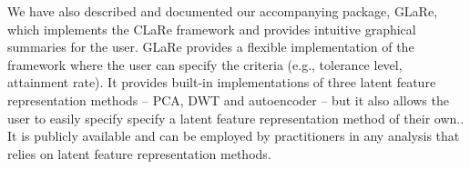 We have also described and documented our accompanying  package, GLaRe, which implements the CLaRe framework and provides intuitive graphical summaries for the user.
GLaRe provides a flexible implementation of the framework where the user can specify the criteria (e.g., tolerance level, attainment rate).
It provides built-in implementations of three latent feature representation methods -- PCA, DWT and autoencoder -- but it also allows the user to easily specify specify a latent feature representation method of their own..
It is publicly available and can be employed by practitioners in any analysis that relies on latent feature representation methods.





